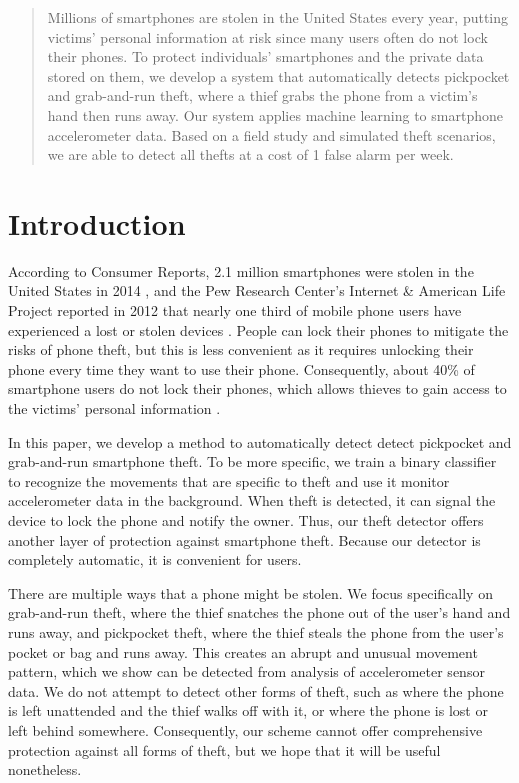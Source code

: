 \documentclass{soups}
\begin{document}
\maketitle
\begin{abstract}
Millions of smartphones are stolen in the United States every year, putting victims' personal information at risk since many users often do not lock their phones. 
To protect individuals' smartphones and the private data stored on them, we develop a system that automatically detects pickpocket and grab-and-run theft, where a thief grabs the phone from a victim's hand then runs away. 
Our system applies machine learning to smartphone accelerometer data. Based on a field study and simulated theft scenarios, we are able to detect all thefts at a cost of 1 false alarm per week.
\end{abstract}




\section{Introduction}
According to Consumer Reports, 2.1 million smartphones were stolen in the United States in 2014 \cite{deitrick:consumer}, and the Pew Research Center's Internet \& American Life Project reported in 2012 that nearly one third of mobile phone users have experienced a lost or stolen devices \cite{boyles:pew}.
People can lock their phones to mitigate the risks of phone theft, but this is less convenient as it requires unlocking their phone every time they want to use their phone.
Consequently, about 40\% of smartphone users do not lock their phones, which allows thieves to gain access to the victims' personal information \cite{egelman:lock}.

In this paper, we develop a method to automatically detect detect pickpocket and grab-and-run smartphone theft. To be more specific, we train a binary classifier to recognize the movements that are specific to theft and use it monitor accelerometer data in the background.
When theft is detected, it can signal the device to lock the phone and notify the owner. Thus, our theft detector offers another layer of protection against smartphone theft.
Because our detector is completely automatic, it is convenient for users.

There are multiple ways that a phone might be stolen.
We focus specifically on grab-and-run theft, where the thief snatches the phone out of the user's hand and runs away, and pickpocket theft, where the thief steals the phone from the user's pocket or bag and runs away.
This creates an abrupt and unusual movement pattern, which we show can be detected from analysis of accelerometer sensor data.
We do not attempt to detect other forms of theft, such as where the phone is left unattended and the thief walks off with it, or where the phone is lost or left behind somewhere.
Consequently, our scheme cannot offer comprehensive protection against all forms of theft, but we hope that it will be useful nonetheless.
\end{document}
